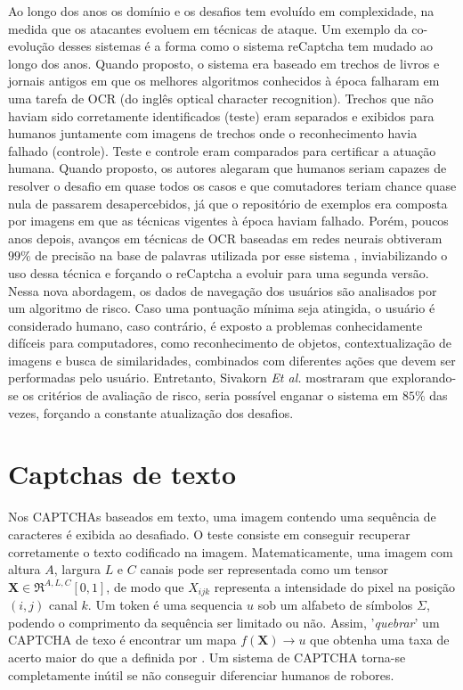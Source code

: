 Ao longo dos anos os domínio e os desafios tem evoluído em complexidade, na medida que os atacantes evoluem em técnicas de ataque. Um exemplo da co-evolução desses sistemas é a forma como o sistema reCaptcha \cite{recaptcha1} tem mudado ao longo dos anos. Quando proposto, o sistema era baseado em trechos de livros e jornais antigos em que os melhores algoritmos conhecidos à época falharam em uma tarefa de OCR (do inglês optical character recognition). Trechos que não haviam sido corretamente identificados (teste) eram separados e exibidos para humanos juntamente com imagens de trechos onde o reconhecimento havia falhado (controle). Teste e controle eram comparados para certificar a atuação humana. Quando proposto, os autores alegaram que humanos seriam capazes de resolver o desafio em quase todos os casos e que comutadores teriam chance quase nula de passarem desapercebidos, já que o repositório de exemplos era composta por imagens em que as técnicas vigentes à época haviam falhado. Porém, poucos anos depois, avanços em técnicas de OCR baseadas em redes neurais obtiveram $99\%$ de precisão na base de palavras utilizada por esse sistema \cite{captcha_break_2013}, inviabilizando o uso dessa técnica e forçando o reCaptcha a evoluir para uma segunda versão. Nessa nova abordagem, os dados de navegação dos usuários são analisados por um algoritmo de risco. Caso uma pontuação mínima seja atingida, o usuário é considerado humano, caso contrário, é exposto a problemas conhecidamente difíceis para computadores, como reconhecimento de objetos, contextualização de imagens e busca de similaridades, combinados com diferentes ações que devem ser performadas pelo usuário. Entretanto, Sivakorn \textit{Et al.} \cite{imarobot} mostraram que explorando-se os critérios de avaliação de risco, seria possível enganar o sistema em $85\%$ das vezes, forçando a constante atualização dos desafios.

\section{Captchas de texto}\label{sec:captchatexto}

Nos CAPTCHAs baseados em texto, uma imagem contendo uma sequência de caracteres é exibida ao desafiado. O teste consiste em conseguir recuperar corretamente o texto codificado na imagem. Matematicamente, uma imagem com altura $A$, largura $L$ e $C$ canais pode ser representada como um tensor $\mathbf{X} \in \Re^{A,L,C}[0,1]$, de modo que  $X_{ijk}$ representa a intensidade do pixel na posição $(i,j)$ canal $k$. Um token é uma sequencia $u$ sob um alfabeto de símbolos $\Sigma$, podendo o comprimento da sequência ser limitado ou não. Assim, '\textit{quebrar}' um CAPTCHA de texo é encontrar um mapa $f(\mathbf{X}) \rightarrow u$ que obtenha uma taxa de acerto maior do que a definida por \cite{lectures2005HIP}. Um sistema de CAPTCHA torna-se completamente inútil se não conseguir diferenciar humanos de robores.

